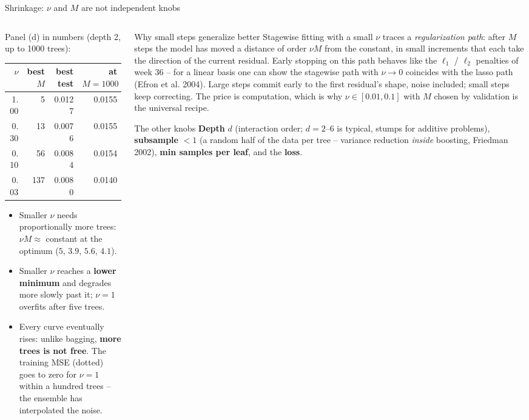 \documentclass[10pt,aspectratio=169]{beamer}
\begin{document}
\begin{frame}{Shrinkage: $\nu$ and $M$ are not independent knobs}
\begin{columns}[T]
\begin{column}{0.5\textwidth}
\footnotesize
Panel (d) in numbers (depth 2, up to 1000 trees):
\begin{center}
\scriptsize
\begin{tabular}{@{}rrrr@{}}
\toprule
$\nu$ & best $M$ & best test & at $M{=}1000$\\
\midrule
1.00 & 5   & 0.0127 & 0.0155\\
0.30 & 13  & 0.0076 & 0.0155\\
0.10 & 56  & 0.0084 & 0.0154\\
0.03 & 137 & 0.0080 & 0.0140\\
\bottomrule
\end{tabular}
\end{center}
\begin{itemize}
  \item Smaller $\nu$ needs proportionally more trees: $\nu M\approx$
    constant at the optimum ($5$, $3.9$, $5.6$, $4.1$).
  \item Smaller $\nu$ reaches a \textbf{lower minimum} and degrades more
    slowly past it; $\nu=1$ overfits after five trees.
  \item Every curve eventually rises: unlike bagging, \textbf{more trees is
    not free}.  The training MSE (dotted) goes to zero for $\nu=1$ within a
    hundred trees -- the ensemble has interpolated the noise.
\end{itemize}
\end{column}
\begin{column}{0.5\textwidth}
\begin{block}{Why small steps generalize better}
\footnotesize
Stagewise fitting with a small $\nu$ traces a \emph{regularization path}:
after $M$ steps the model has moved a distance of order $\nu M$ from the
constant, in small increments that each take the direction of the current
residual.  Early stopping on this path behaves like the $\ell_1$ /
$\ell_2$ penalties of week 36 -- for a linear basis one can show the
stagewise path with $\nu\to0$ coincides with the lasso path (Efron et al.
2004).  Large steps commit early to the first residual's shape, noise
included; small steps keep correcting.  The price is computation, which is
why $\nu\in[0.01,0.1]$ with $M$ chosen by validation is the universal
recipe.
\end{block}
\begin{block}{The other knobs}
\footnotesize
\textbf{Depth} $d$ (interaction order; $d=2$--$6$ is typical, stumps for
additive problems), \textbf{subsample} $<1$ (a random half of the data per
tree -- variance reduction \emph{inside} boosting, Friedman 2002),
\textbf{min samples per leaf}, and the \textbf{loss}.
\end{block}
\end{column}
\end{columns}
\end{frame}
\end{document}
